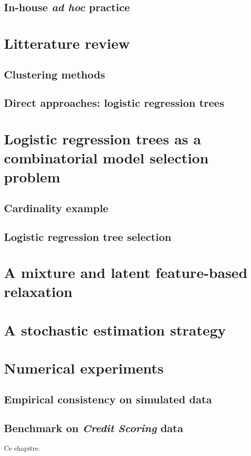 \subsection{In-house \textit{ad hoc} practice}





\section{Litterature review}


\subsection{Clustering methods}


\subsection{Direct approaches: logistic regression trees}



\section{Logistic regression trees as a combinatorial model selection problem}


\subsection{Cardinality example}


\subsection{Logistic regression tree selection}



\section{A mixture and latent feature-based relaxation}




\section{A stochastic estimation strategy}


\section{Numerical experiments}


\subsection{Empirical consistency on simulated data}

\subsection{Benchmark on \textit{Credit Scoring} data}




\bigskip

Ce chapitre.


\printbibliography[heading=subbibliography, title=References of Chapter 5]

